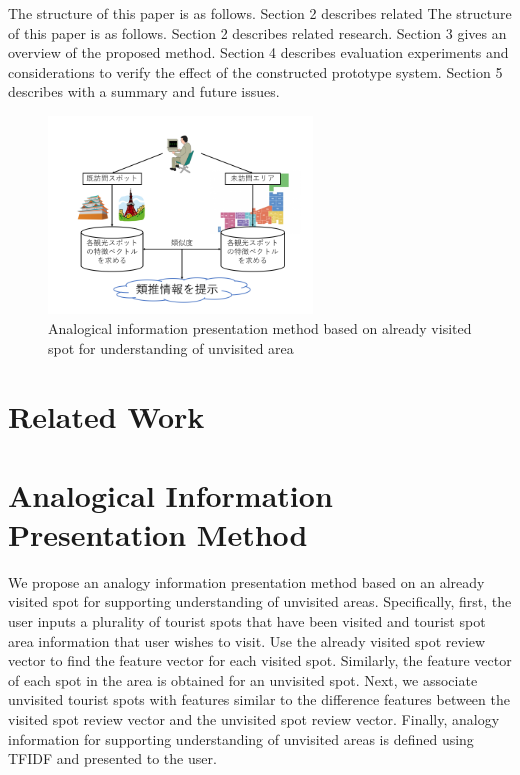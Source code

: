 \documentclass[journal]{IAENGtran}
\begin{document}
The structure of this paper is as follows. Section 2 describes related The structure of this paper is as follows. Section 2 describes related research. Section 3 gives an overview of the proposed method. Section 4 describes evaluation experiments and considerations to verify the effect of the constructed prototype system. Section 5 describes with a summary and future issues.

\begin{figure}[!t]
  \begin{center}
    \includegraphics[clip,width=7.0cm]{picture/Photo_Image.png}
    \caption{Analogical information presentation method based on already visited spot for understanding of unvisited area}
    \label{fig:Photo_Image}
   \end{center}
\end{figure}


\section{Related Work}
\label{sec:Related Work}


\section{Analogical Information Presentation Method}
\label{sec:Analogical Information Presentation Method}
We propose an analogy information presentation method based on an already visited spot for supporting understanding of unvisited areas. Specifically, first, the user inputs a plurality of tourist spots that have been visited and tourist spot area information that user wishes to visit. Use the already visited spot review vector to find the feature vector for each visited spot. Similarly, the feature vector of each spot in the area is obtained for an unvisited spot. Next, we associate unvisited tourist spots with features similar to the difference features between the visited spot review vector and the unvisited spot review vector. Finally, analogy information for supporting understanding of unvisited areas is defined using TFIDF and presented to the user.
\end{document}
